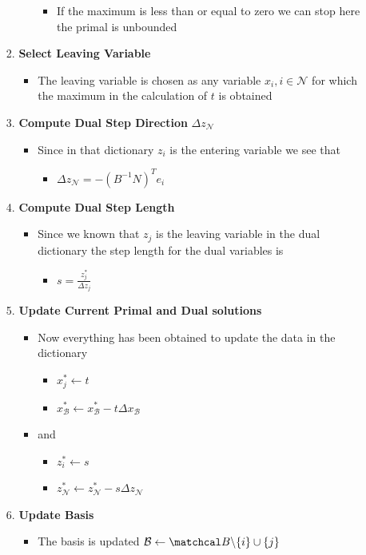 \documentclass[11pt]{article}
\begin{document}
\begin{itemize}
\begin{itemize}
\begin{enumerate}
\begin{itemize}
\begin{itemize}
\item If the maximum is less than or equal to zero we can stop here the primal is unbounded
\end{itemize}
\end{itemize}
\item \textbf{Select Leaving Variable}
\begin{itemize}
\item The leaving variable is chosen as any variable \(x_i, i \in \mathcal N\) for which the maximum in the calculation of \(t\) is obtained
\end{itemize}
\item \textbf{Compute Dual Step Direction} \(\Delta z_{\mathcal N}\)
\begin{itemize}
\item Since in that dictionary \(z_i\) is the entering variable we see that
\begin{itemize}
\item \(\Delta z_{\mathcal N} = -(B^{-1} N) ^T e_i\)
\end{itemize}
\end{itemize}
\item \textbf{Compute Dual Step Length}
\begin{itemize}
\item Since we known that \(z_j\) is the leaving variable in the dual dictionary the step length for the dual variables is
\begin{itemize}
\item \(s = \frac{z_j^*}{\Delta z_j}\)
\end{itemize}
\end{itemize}
\item \textbf{Update Current Primal and Dual solutions}
\begin{itemize}
\item Now everything has been obtained to update the data in the dictionary
\begin{itemize}
\item \(x_j^* \leftarrow t\)
\item \(x_{\mathcal B}^* \leftarrow x_{\mathcal B}^* - t \Delta x_{\mathcal B}\)
\end{itemize}
\item and
\begin{itemize}
\item \(z_i^* \leftarrow s\)
\item \(z_{\mathcal N}^* \leftarrow z_{\mathcal N}^* - s \Delta z_{\mathcal N}\)
\end{itemize}
\end{itemize}
\item \textbf{Update Basis}
\begin{itemize}
\item The basis is updated \(\mathcal B \leftarrow \matchcal B \backslash \{ i \} \cup \{ j \}\)
\end{itemize}
\end{enumerate}
\end{itemize}
\end{itemize}
\end{document}
